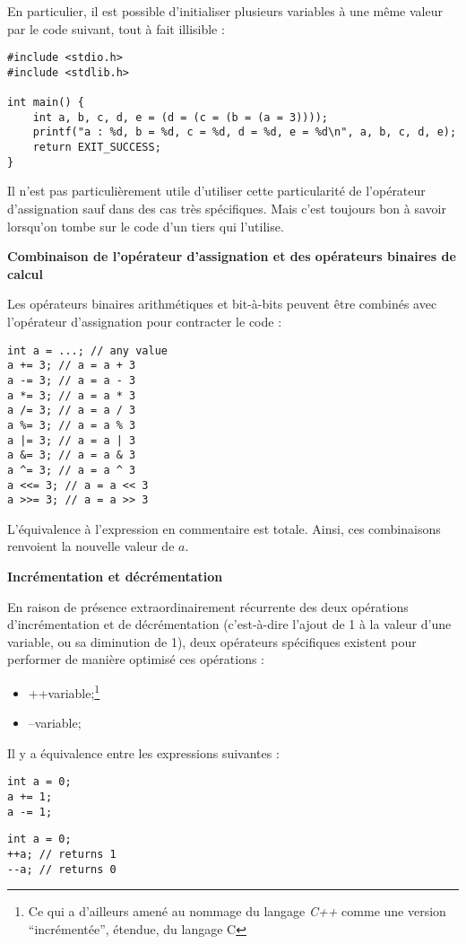 \documentclass[../../../main.tex]{subfiles}
\begin{document}
En particulier, il est possible d'initialiser plusieurs variables à une même valeur par le code suivant, tout à fait illisible :
\begin{verbatim}
#include <stdio.h>
#include <stdlib.h>

int main() {
	int a, b, c, d, e = (d = (c = (b = (a = 3))));
	printf("a : %d, b = %d, c = %d, d = %d, e = %d\n", a, b, c, d, e);
	return EXIT_SUCCESS;
}
\end{verbatim}
Il n'est pas particulièrement utile d'utiliser cette particularité de l'opérateur d'assignation sauf dans des cas très spécifiques. Mais c'est toujours bon à savoir lorsqu'on tombe sur le code d'un tiers qui l'utilise.
 
\textbf{Combinaison de l'opérateur d'assignation et des opérateurs binaires de calcul}
 
Les opérateurs binaires arithmétiques et bit-à-bits peuvent être combinés avec l'opérateur d'assignation pour contracter le code :
\begin{verbatim}
int a = ...; // any value
a += 3; // a = a + 3
a -= 3; // a = a - 3
a *= 3; // a = a * 3
a /= 3; // a = a / 3
a %= 3; // a = a % 3
a |= 3; // a = a | 3
a &= 3; // a = a & 3
a ^= 3; // a = a ^ 3
a <<= 3; // a = a << 3
a >>= 3; // a = a >> 3
\end{verbatim}
L'équivalence à l'expression en commentaire est totale. Ainsi, ces combinaisons renvoient la nouvelle valeur de $a$.
 
\textbf{Incrémentation et décrémentation}
 
En raison de présence extraordinairement récurrente des deux opérations d'incrémentation et de décrémentation (c'est-à-dire l'ajout de 1 à la valeur d'une variable, ou sa diminution de 1), deux opérateurs spécifiques existent pour performer de manière optimisé ces opérations :
\begin{itemize}
	\item \textsf{++variable;}\footnote{Ce qui a d'ailleurs amené au nommage du langage \textit{C++} comme une version ``incrémentée'', étendue, du langage C}
	\item \textsf{--variable;}
\end{itemize}
Il y a équivalence entre les expressions suivantes :
 
\begin{minipage}{0.5\textwidth}
\begin{verbatim}
int a = 0;
a += 1;
a -= 1;
\end{verbatim}
\end{minipage}
\begin{minipage}{0.5\textwidth}
\begin{verbatim}
int a = 0;
++a; // returns 1
--a; // returns 0
\end{verbatim}
\end{minipage}
\end{document}
